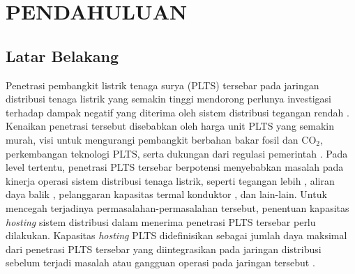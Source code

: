 \chapter{PENDAHULUAN}

\section{Latar Belakang}
Penetrasi pembangkit listrik tenaga surya (PLTS) tersebar pada jaringan distribusi tenaga listrik yang semakin tinggi \cite{international_energy_agency_photovoltaics_power_systems_2020_2020,international_renewable_energy_agency_renewable_2020} mendorong perlunya investigasi terhadap dampak negatif yang diterima oleh sistem distribusi tegangan rendah \cite{hasheminamin_index-based_2015, reno_novel_2016,olivier_active_2016,santos-martin_simplified_2016,elrayyah_simplified_2017,mortazavi_monitoring_2015,andresen_thermal_2016}. Kenaikan penetrasi tersebut disebabkan oleh harga unit PLTS yang semakin murah, visi untuk mengurangi pembangkit berbahan bakar fosil dan CO$_2$, perkembangan teknologi PLTS, serta dukungan dari regulasi pemerintah \cite{abreu_new_2019,comello_road_2018,karakaya_motivators_2015,handayani_fossil_2019}. Pada level tertentu, penetrasi PLTS tersebar berpotensi menyebabkan masalah pada kinerja operasi sistem distribusi tenaga listrik, seperti tegangan lebih \cite{hasheminamin_index-based_2015,reno_novel_2016,olivier_active_2016,santos-martin_simplified_2016,elrayyah_simplified_2017}, aliran daya balik \cite{mortazavi_monitoring_2015,hasheminamin_index-based_2015}, pelanggaran kapasitas termal konduktor \cite{reno_novel_2016,andresen_thermal_2016}, dan lain-lain. Untuk mencegah terjadinya permasalahan-permasalahan tersebut, penentuan kapasitas \textit{hosting} sistem distribusi dalam menerima penetrasi PLTS tersebar perlu dilakukan. Kapasitas \textit{hosting} PLTS didefinisikan sebagai jumlah daya maksimal dari penetrasi PLTS tersebar yang diintegrasikan pada jaringan distribusi sebelum terjadi masalah atau gangguan operasi pada jaringan tersebut \cite{bollen_integration_2011}.

